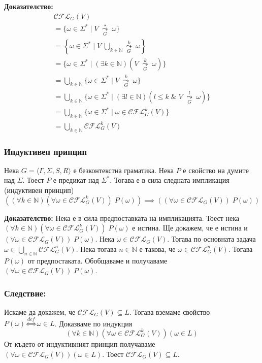 \documentclass[12pt]{article}
\begin{document}
\textbf{Доказателство:}
\begin{align*}
    \mathcal{CFL}_G(V) \\
    = \{\omega \in \Sigma^* \mid V \; \underset{G}{\overset{\star}{\leadsto}} \; \omega\} \\
    = \left\{\omega \in \Sigma^* \mid V \; \displaystyle\bigcup_{k \in \mathbb{N}} \underset{G}{\overset{k}{\leadsto}} \; \omega \right\} \\
    = \{\omega \in \Sigma^* \mid (\exists k \in \mathbb{N})(V \; \underset{G}{\overset{k}{\leadsto}} \; \omega)\} \\
    = \displaystyle\bigcup_{k \in \mathbb{N}} \{\omega \in \Sigma^* \mid V \; \underset{G}{\overset{k}{\leadsto}} \; \omega\} \\
    = \displaystyle\bigcup_{k \in \mathbb{N}} \{\omega \in \Sigma^* \mid (\exists l \in \mathbb{N})(l \leq k \;\&\; V \; \underset{G}{\overset{l}{\leadsto}} \; \omega)\} \\
    = \displaystyle\bigcup_{k \in \mathbb{N}} \{\omega \in \Sigma^* \mid \omega \in \mathcal{CFL}_G^k(V)\} \\
    = \displaystyle\bigcup_{k \in \mathbb{N}} \mathcal{CFL}_G^k(V) 
\end{align*}

\subsubsection*{Индуктивен принцип}
Нека \(G = \langle \Gamma,  \Sigma, S, R\rangle\) е безконтекстна граматика.
Нека \(P\) е свойство на думите над \(\Sigma\). Тоест \(P\) е предикат над \(\Sigma^*\).
Тогава е в сила следната импликация (индуктивен принцип)
\[((\forall k \in \mathbb N)(\forall \omega \in \mathcal{CFL}_G^k(V)) \; P(\omega)) \implies ((\forall \omega \in \mathcal{CFL}_G(V)) \; P(\omega))\]

\textbf{Доказателство:}
Нека е в сила предпоставката на импликацията.
Тоест нека \((\forall k \in \mathbb N)(\forall \omega \in \mathcal{CFL}_G^k(V)) \; P(\omega)\) е истина.
Ще докажем, че е истина и \((\forall \omega \in \mathcal{CFL}_G(V)) \; P(\omega)\).
Нека \(\omega \in \mathcal{CFL}_G(V)\). Тогава по основната задача \(\omega \in \displaystyle\bigcup_{n \in \mathbb{N}} \mathcal{CFL}_G^n(V)\).
Нека тогава \(n \in \mathbb N\) е такова, че \(\omega \in \mathcal{CFL}_G^n(V)\). Тогава \(P(\omega)\) от предпостаката.
Обобщаваме и получаваме \((\forall \omega \in \mathcal{CFL}_G(V)) \; P(\omega)\).

\subsubsection*{Следствие:}
Искаме да докажем, че \(\mathcal{CFL}_G(V) \subseteq L\).
Тогава вземаме свойство \\
\(P(\omega) \overset{def}{\iff} \omega \in L\).
Доказваме по индукция
\[(\forall k \in \mathbb N)(\forall \omega \in \mathcal{CFL}_G^k(V))(\omega \in L) \]
От където от индуктивният принцип получаваме \\
\((\forall \omega \in \mathcal{CFL}_G(V))(\omega \in L)\).
Тоест \(\mathcal{CFL}_G(V) \subseteq L\).
\end{document}
